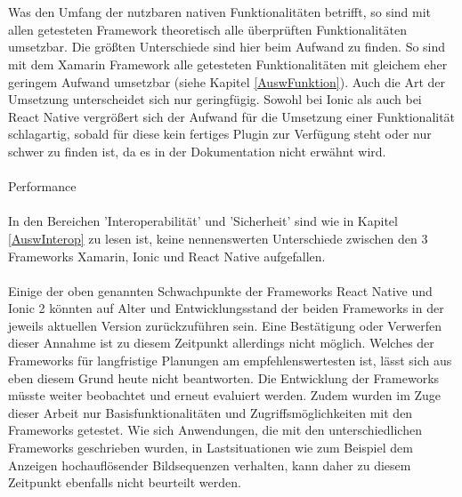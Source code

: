 \\
\\
Was den Umfang der nutzbaren nativen Funktionalitäten betrifft, so sind mit allen getesteten Framework theoretisch alle überprüften Funktionalitäten umsetzbar. Die größten Unterschiede sind hier beim Aufwand zu finden. So sind mit dem Xamarin Framework alle getesteten Funktionalitäten mit gleichem eher geringem Aufwand umsetzbar (siehe Kapitel \ref{AuswFunktion}). Auch die Art der Umsetzung unterscheidet sich nur geringfügig. Sowohl bei Ionic als auch bei React Native vergrößert sich der Aufwand für die Umsetzung einer Funktionalität schlagartig, sobald für diese kein fertiges Plugin zur Verfügung steht oder nur schwer zu finden ist, da es in der Dokumentation nicht erwähnt wird.
\\
\\
Performance
\\
\\
In den Bereichen 'Interoperabilität' und 'Sicherheit' sind wie in Kapitel \ref{AuswInterop} zu lesen ist, keine nennenswerten Unterschiede zwischen den 3 Frameworks Xamarin, Ionic und React Native aufgefallen.
\\
\\
Einige der oben genannten Schwachpunkte der Frameworks React Native und Ionic 2 könnten auf Alter und Entwicklungsstand der beiden Frameworks in der jeweils aktuellen Version zurückzuführen sein. Eine Bestätigung oder Verwerfen dieser Annahme ist zu diesem Zeitpunkt allerdings nicht möglich. Welches der Frameworks für langfristige Planungen am empfehlenswertesten ist, lässt sich aus eben diesem Grund heute nicht beantworten. Die Entwicklung der Frameworks müsste weiter beobachtet und erneut evaluiert werden. Zudem wurden im Zuge dieser Arbeit nur Basisfunktionalitäten und Zugriffsmöglichkeiten mit den Frameworks getestet. Wie sich Anwendungen, die mit den unterschiedlichen Frameworks geschrieben wurden, in Lastsituationen wie zum Beispiel dem Anzeigen hochauflösender Bildsequenzen verhalten, kann daher zu diesem Zeitpunkt ebenfalls nicht beurteilt werden.